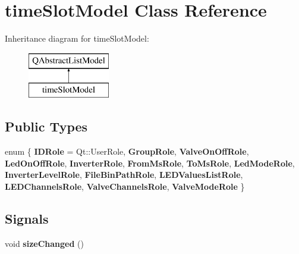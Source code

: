 \hypertarget{classtime_slot_model}{}\section{time\+Slot\+Model Class Reference}
\label{classtime_slot_model}
Inheritance diagram for time\+Slot\+Model\+:\begin{figure}[H]
\begin{center}
\leavevmode
\includegraphics[height=2.000000cm]{classtime_slot_model}
\end{center}
\end{figure}
\subsection*{Public Types}
\begin{DoxyCompactItemize}
\item 
\mbox{\label{classtime_slot_model_a5c2509a4c20e6cbafb13d582c2e73424}} 
enum \{ \newline
{\bfseries I\+D\+Role} = Qt\+:\+:User\+Role, 
{\bfseries Group\+Role}, 
{\bfseries Valve\+On\+Off\+Role}, 
{\bfseries Led\+On\+Off\+Role}, 
\newline
{\bfseries Inverter\+Role}, 
{\bfseries From\+Ms\+Role}, 
{\bfseries To\+Ms\+Role}, 
{\bfseries Led\+Mode\+Role}, 
\newline
{\bfseries Inverter\+Level\+Role}, 
{\bfseries File\+Bin\+Path\+Role}, 
{\bfseries L\+E\+D\+Values\+List\+Role}, 
{\bfseries L\+E\+D\+Channels\+Role}, 
\newline
{\bfseries Valve\+Channels\+Role}, 
{\bfseries Valve\+Mode\+Role}
 \}
\end{DoxyCompactItemize}
\subsection*{Signals}
\begin{DoxyCompactItemize}
\item 
\mbox{\label{classtime_slot_model_a76b7beaf6bf598a5e12cf0e57100ffd1}} 
void {\bfseries size\+Changed} ()
\end{DoxyCompactItemize}
